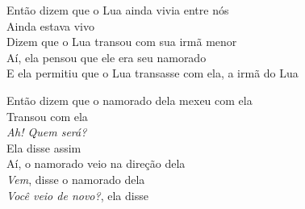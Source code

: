 \begin{linenumbers}\begingroup\raggedright
\noindent Então dizem que o Lua ainda vivia entre nós\\
Ainda estava vivo\\
Dizem que o Lua transou com sua irmã menor\\
Aí, ela pensou que ele era seu namorado\\
E ela permitiu que o Lua transasse com ela, a irmã do Lua
\end{linenumbers}\endgroup

\bigskip

\begin{linenumbers}\begingroup\raggedright
\noindent Então dizem que o namorado dela mexeu com ela\\
Transou com ela\\
\textit{Ah! Quem será?}\\
Ela disse assim\\
Aí, o namorado veio na direção dela\\
\textit{Vem}, disse o namorado dela\\
\textit{Você veio de novo?}, ela disse
\end{linenumbers}\endgroup

\bigskip

